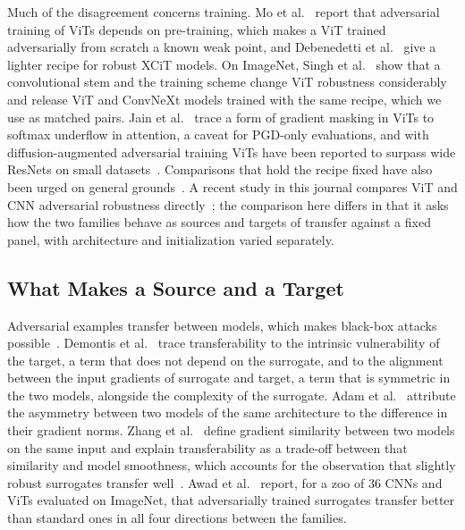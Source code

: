 Much of the disagreement concerns training. Mo et al.~\cite{mo2022adversarial} report that adversarial training of ViTs depends on pre-training, which makes a ViT trained adversarially from scratch a known weak point, and Debenedetti et al.~\cite{debenedetti2023light} give a lighter recipe for robust XCiT models. On ImageNet, Singh et al.~\cite{singh2023revisiting} show that a convolutional stem and the training scheme change ViT robustness considerably and release ViT and ConvNeXt models trained with the same recipe, which we use as matched pairs. Jain et al.~\cite{jain2024towards} trace a form of gradient masking in ViTs to softmax underflow in attention, a caveat for PGD-only evaluations, and with diffusion-augmented adversarial training ViTs have been reported to surpass wide ResNets on small datasets~\cite{wu2025vision}. Comparisons that hold the recipe fixed have also been urged on general grounds~\cite{pinto2022impartial}. A recent study in this journal compares ViT and CNN adversarial robustness directly~\cite{ali2024adversarial}; the comparison here differs in that it asks how the two families behave as sources and targets of transfer against a fixed panel, with architecture and initialization varied separately.

\subsection{What Makes a Source and a Target}
\label{subsec:rw_transfer}

Adversarial examples transfer between models, which makes black-box attacks possible~\cite{papernot2016transferability}. Demontis et al.~\cite{demontis2019adversarial} trace transferability to the intrinsic vulnerability of the target, a term that does not depend on the surrogate, and to the alignment between the input gradients of surrogate and target, a term that is symmetric in the two models, alongside the complexity of the surrogate. Adam et al.~\cite{adam2019reducing} attribute the asymmetry between two models of the same architecture to the difference in their gradient norms. Zhang et al.~\cite{zhang2024why} define gradient similarity between two models on the same input and explain transferability as a trade-off between that similarity and model smoothness, which accounts for the observation that slightly robust surrogates transfer well~\cite{springer2021little}. Awad et al.~\cite{awad2025defense} report, for a zoo of 36 CNNs and ViTs evaluated on ImageNet, that adversarially trained surrogates transfer better than standard ones in all four directions between the families.

